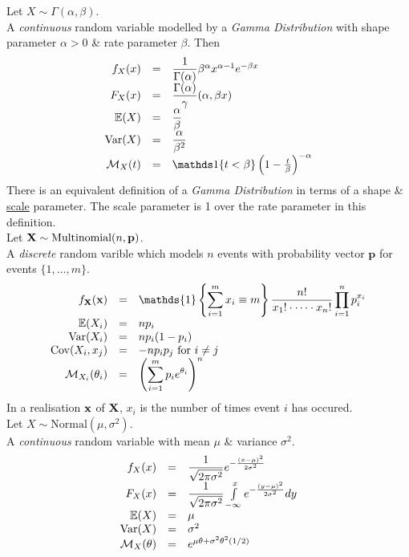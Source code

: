 \documentclass[11pt,a4paper]{article}
\begin{document}
Let $X\sim\Gamma(\alpha,\beta)$.\\
A \textit{continuous} random variable modelled by a \textit{Gamma Distribution} with shape parameter $\alpha>0$ \& rate parameter $\beta$. Then
\[\begin{array}{rcll}
f_X(x)&=&\dfrac{1}{\Gamma(\alpha)}\beta^\alpha x^{\alpha-1}e^{-\beta x}\\
F_X(x)&=&\dfrac{\Gamma(\alpha)}\gamma(\alpha,\beta x)\\
\expect(X)&=&\dfrac{\alpha}{\beta}\\
\var(X)&=&\dfrac{\alpha}{\beta^2}\\
\mathcal{M}_X(t)&=&\indicator\{t<\beta\}\left(1-\frac{t}{\beta}\right)^{-\alpha}
\end{array}\]
\nb There is an equivalent definition of a \textit{Gamma Distribution} in terms of a shape \& \underline{scale} parameter. The scale parameter is 1 over the rate parameter in this definition.\\

Let $\textbf{X}\sim\text{Multinomial}(n,\textbf{p})$.\\
A \textit{discrete} random varible which models $n$ events with probability vector $\textbf{p}$ for events $\{1,\dots,m\}$.\\
\[\begin{array}{rcl}
f_\X(\x)&=&{\displaystyle\mathds{1}\left\{\sum_{i=1}^mx_i\equiv m\right\}\frac{n!}{x_1!\cdot\dots\cdot x_n!}\prod_{i=1}^np_i^{x_i}}\\
\expect(X_i)&=&np_i\\
\var(X_i)&=&np_i(1-p_i)\\
\cov(X_i,x_j)&=&-np_ip_j\text{ for }i\neq j\\
\mathcal{M}_{X_i}(\theta_i)&=&\left(\displaystyle\sum_{i=1}^mp_ie^{\theta_i}\right)^n
\end{array}\]
\nb In a realisation $\textbf{x}$ of $\textbf{X}$, $x_i$ is the number of times event $i$ has occured.\\

Let $X\sim\text{Normal}(\mu,\sigma^2)$.\\
A \textit{continuous} random variable  with mean $\mu$ \& variance $\sigma^2$.
\[\begin{array}{rcl}
f_X(x)&=&\dfrac{1}{\sqrt{2\pi\sigma^2}}e^{-\frac{(x-\mu)^2}{2\sigma^2}}\\
F_X(x)&=&\dfrac{1}{\sqrt{2\pi\sigma^2}}\int\limits_{-\infty}^xe^{-\frac{(y-\mu)^2}{2\sigma^2}}dy\\
\mathbb{E}(X)&=&\mu\\
\mathrm{Var}(X)&=&\sigma^2\\
\mathcal{M}_X(\theta)&=&e^{\mu\theta+\sigma^2\theta^2(1/2)}
\end{array}\]
\end{document}
